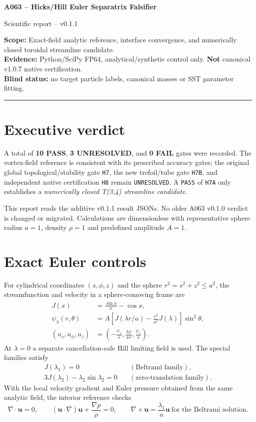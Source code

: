 \documentclass[10pt,a4paper]{article}
\begin{document}
{\Large\bfseries\color{ink} A063 -- Hicks/Hill Euler Separatrix Falsifier}\par
{\large Scientific report -- v0.1.1}\par
\smallskip
\textbf{Scope:} Exact-field analytic reference, interface convergence, and numerically closed toroidal streamline candidate.\\
\textbf{Evidence:} Python/SciPy FP64, analytical/synthetic control only. \textbf{Not} canonical v1.0.7 native certification.\\
\textbf{Blind status:} no target particle labels, canonical masses or SST parameter fitting.
\vspace{2mm}\hrule
\section{Executive verdict}
A total of \textbf{10 PASS}, \textbf{3 UNRESOLVED}, and \textbf{0 FAIL} gates were recorded. The vortex-field reference is consistent with its prescribed accuracy gates; the original global topological/stability gate \texttt{H7}, the new trefoil/tube gate \texttt{H7B}, and independent native certification \texttt{H8} remain \texttt{UNRESOLVED}. A \texttt{PASS} of \texttt{H7A} only establishes a \emph{numerically closed T(3,4) streamline candidate}.

This report reads the additive v0.1.1 result JSONs. No older A063 v0.1.0 verdict is changed or migrated. Calculations are dimensionless with representative sphere radius $a=1$, density $\rho=1$ and predefined amplitude $A=1$.

\section{Exact Euler controls}
For cylindrical coordinates $(s,\phi,z)$ and the sphere $r^2=s^2+z^2\leq a^2$, the streamfunction and velocity in a sphere-comoving frame are
\begin{align}
J(x)&=\frac{\sin x}{x}-\cos x,\\
\psi_\lambda(r,\theta)&=A\left[J(\lambda r/a)-\frac{r^2}{a^2}J(\lambda)\right]\sin^2\theta,\\
(u_s,u_\phi,u_z)&=\left(-\frac{\psi_z}{s},\frac{\lambda\psi}{as},\frac{\psi_s}{s}\right).
\end{align}
At $\lambda=0$ a separate cancellation-safe Hill limiting field is used. The special families satisfy
\begin{align}
J(\lambda_1)=0\quad &(\text{Beltrami family}),\\
3J(\lambda_2)-\lambda_2\sin\lambda_2=0\quad &(\text{zero-translation family}).
\end{align}
With the local velocity gradient and Euler pressure obtained from the same analytic field, the interior reference checks
\begin{equation}
\nabla\cdot\mathbf u=0,\qquad (\mathbf u\cdot\nabla)\mathbf u+\frac{\nabla p}{\rho}=0,
\qquad \nabla\times\mathbf u=\frac{\lambda_1}{a}\mathbf u\ \text{for the Beltrami solution}.
\end{equation}
\end{document}
